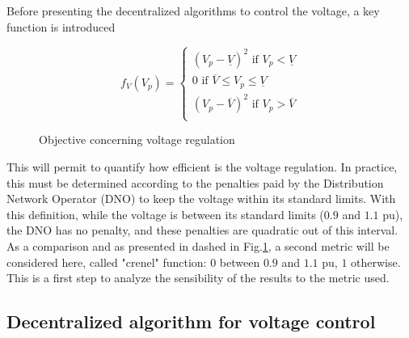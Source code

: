 \documentclass[journal]{IEEEtran}
\begin{document}
Before presenting the decentralized algorithms to control the voltage, a key function is introduced

\begin{equation}
f_V(V_p)=
\begin{cases}
(V_p-\underline{V})^2 \text{ if } V_p<\underline{V} \\
0 \text{ if } \overline{V} \leq V_p \leq \underline{V} \\
(V_p-\overline{V})^2 \text{ if } V_p>\overline{V} \\
\end{cases}
\end{equation}

\begin{figure}[!htbp]
\centering
{}
\caption{Objective concerning voltage regulation}
\label{fig:PhysMetr}
\end{figure}

This will permit to quantify how efficient is the voltage regulation. In practice, this must be determined according to the penalties paid by the Distribution Network Operator (DNO) to keep the voltage within its standard limits. With this definition, while the voltage is between its standard limits ($0.9$ and $1.1$ pu), the DNO has no penalty, and these penalties are quadratic out of this interval. As a comparison and as presented in dashed in Fig.\ref{fig:PhysMetr}, a second metric will be considered here, called "crenel" function: $0$ between $0.9$ and $1.1$ pu, $1$ otherwise. This is a first step to analyze the sensibility of the results to the metric used.

\subsection{Decentralized algorithm for voltage control}
\end{document}
